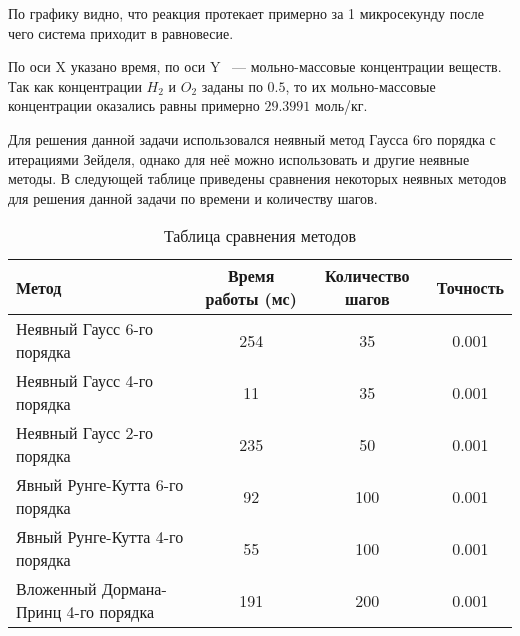 %             


По графику видно, что реакция протекает примерно за 1 микросекунду после чего система приходит в равновесие.

По оси X указано время, по оси Y ~--- мольно-массовые концентрации веществ. Так как концентрации $H_2$ и $O_2$ заданы по $0.5$, то их
мольно-массовые концентрации оказались равны примерно $29.3991$ моль/кг.

Для решения данной задачи использовался неявный метод Гаусса 6го порядка с итерациями Зейделя, однако для неё можно использовать и
другие неявные методы. В следующей таблице приведены сравнения некоторых неявных методов для решения данной задачи по времени и
количеству шагов.

\begin{table}    
    \caption{Таблица сравнения методов}
    \begin{tabularx}{\textwidth}{|X|c|c|c|}
    \hline
    Метод & Время работы (мс) & Количество шагов & Точность\\
    \hline
    Неявный Гаусс 6-го порядка & 254 & 35 & 0.001\\
    \hline
    Неявный Гаусс 4-го порядка & 11 & 35 & 0.001\\
    \hline
    Неявный Гаусс 2-го порядка & 235 & 50 & 0.001\\
    \hline
    Явный Рунге-Кутта 6-го порядка & 92 & 100 & 0.001\\
    \hline
    Явный Рунге-Кутта 4-го порядка & 55 & 100 & 0.001\\
    \hline
    Вложенный Дормана-Принц 4-го порядка & 191 & 200 & 0.001\\
    \hline
    \end{tabularx}
    \label{tab:Methods}
\end{table}

